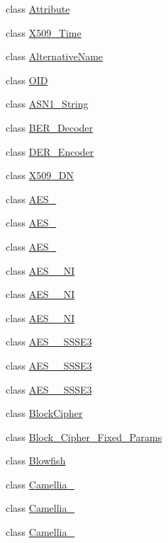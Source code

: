\begin{DoxyCompactItemize}
\item 
class \hyperlink{classBotan_1_1Attribute}{Attribute}
\item 
class \hyperlink{classBotan_1_1X509__Time}{X509\-\_\-\-Time}
\item 
class \hyperlink{classBotan_1_1AlternativeName}{Alternative\-Name}
\item 
class \hyperlink{classBotan_1_1OID}{O\-I\-D}
\item 
class \hyperlink{classBotan_1_1ASN1__String}{A\-S\-N1\-\_\-\-String}
\item 
class \hyperlink{classBotan_1_1BER__Decoder}{B\-E\-R\-\_\-\-Decoder}
\item 
class \hyperlink{classBotan_1_1DER__Encoder}{D\-E\-R\-\_\-\-Encoder}
\item 
class \hyperlink{classBotan_1_1X509__DN}{X509\-\_\-\-D\-N}
\item 
class \hyperlink{classBotan_1_1AES__128}{A\-E\-S\-\_}
\item 
class \hyperlink{classBotan_1_1AES__192}{A\-E\-S\-\_}
\item 
class \hyperlink{classBotan_1_1AES__256}{A\-E\-S\-\_}
\item 
class \hyperlink{classBotan_1_1AES__128__NI}{A\-E\-S\-\_\-\_\-\-N\-I}
\item 
class \hyperlink{classBotan_1_1AES__192__NI}{A\-E\-S\-\_\-\_\-\-N\-I}
\item 
class \hyperlink{classBotan_1_1AES__256__NI}{A\-E\-S\-\_\-\_\-\-N\-I}
\item 
class \hyperlink{classBotan_1_1AES__128__SSSE3}{A\-E\-S\-\_\-\_\-\-S\-S\-S\-E3}
\item 
class \hyperlink{classBotan_1_1AES__192__SSSE3}{A\-E\-S\-\_\-\_\-\-S\-S\-S\-E3}
\item 
class \hyperlink{classBotan_1_1AES__256__SSSE3}{A\-E\-S\-\_\-\_\-\-S\-S\-S\-E3}
\item 
class \hyperlink{classBotan_1_1BlockCipher}{Block\-Cipher}
\item 
class \hyperlink{classBotan_1_1Block__Cipher__Fixed__Params}{Block\-\_\-\-Cipher\-\_\-\-Fixed\-\_\-\-Params}
\item 
class \hyperlink{classBotan_1_1Blowfish}{Blowfish}
\item 
class \hyperlink{classBotan_1_1Camellia__128}{Camellia\-\_}
\item 
class \hyperlink{classBotan_1_1Camellia__192}{Camellia\-\_}
\item 
class \hyperlink{classBotan_1_1Camellia__256}{Camellia\-\_}

\end{DoxyCompactItemize}
